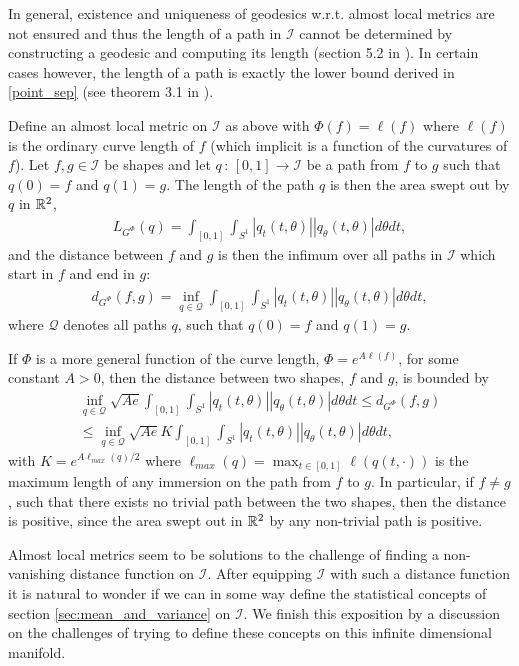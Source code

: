 In general, existence and uniqueness of geodesics w.r.t. almost local metrics are not ensured and thus the length of a path in $\mathcal{I}$ cannot be determined by constructing a geodesic and computing its length (section 5.2 in \cite{bauer2014overview}). In certain cases however, the length of a path is exactly the lower bound derived in \ref{point_sep} (see theorem 3.1 in \cite{shah2007h0type}).

\begin{example}
Define an almost local metric on $\mathcal{I}$ as above with $\Phi(f) = \ell(f)$ where $\ell(f)$ is the ordinary curve length of $f$ (which implicit is a function of the curvatures of $f$). Let $f, g \in \mathcal{I}$ be shapes and let $q \, : \, [0,1] \rightarrow \mathcal{I}$ be a path from $f$ to $g$ such that $q(0) = f$ and $q(1) = g$. The length of the path $q$ is then the area swept out by $q$ in $\mathbb{R}^2$,
\begin{align*}
L_{G^\Phi}(q) = \int_{[0,1]} \int_{S^1} \left| q_t(t, \theta) \right| \left| q_\theta(t, \theta) \right| d\theta dt,
\end{align*}
and the distance between $f$ and $g$ is then the infimum over all paths in $\mathcal{I}$ which start in $f$ and end in $g$:
\begin{align*}
d_{G^\Phi}(f, g) = \inf_{q\in\mathcal{Q}} \int_{[0,1]} \int_{S^1} \left| q_t(t, \theta) \right| \left| q_\theta(t, \theta) \right| d\theta dt,
\end{align*}
where $\mathcal{Q}$ denotes all paths $q$, such that $q(0) = f$ and $q(1) = g$.
\end{example}
\begin{example}
If $\Phi$ is a more general function of the curve length, $\Phi = e^{A \ell (f)}$, for some constant $A > 0$, then the distance between two shapes, $f$ and $g$, is bounded by
\begin{align*}
\inf_{q\in\mathcal{Q}} \sqrt{A e} \int_{[0,1]} \int_{S^1} \left| q_t(t, \theta) \right| \left| q_\theta(t, \theta) \right| d\theta dt \leq d_{G^\Phi}(f, g) \\
 \leq \inf_{q\in\mathcal{Q}} \sqrt{A e} K \int_{[0,1]} \int_{S^1} \left| q_t(t, \theta) \right| \left| q_\theta(t, \theta) \right| d\theta dt,
\end{align*}
with $K = e^{A \ell_{max}(q) / 2}$ where $\ell_{max} (q) = \max_{t \in [0,1]} \ell (q(t, \cdot))$ is the maximum length of any immersion on the path from $f$ to $g$. In particular, if $f \neq g$, such that there exists no trivial path between the two shapes, then the distance is positive, since the area swept out in $\mathbb{R}^2$ by any non-trivial path is positive.
\end{example}
Almost local metrics seem to be solutions to the challenge of finding a non-vanishing distance function on $\mathcal{I}$. After equipping $\mathcal{I}$ with such a distance function it is natural to wonder if we can in some way define the statistical concepts of section \ref{sec:mean_and_variance} on $\mathcal{I}$. We finish this exposition by a discussion on the challenges of trying to define these concepts on this infinite dimensional manifold.





